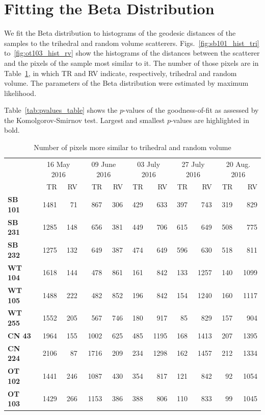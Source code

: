 \documentclass[12pt]{article}
\begin{document}
\section{Fitting the Beta Distribution}

We fit the Beta distribution to histograms of the geodesic distances of the samples to the trihedral and random volume scatterers. Figs.~\ref{fig:sb101_hist_tri} to~\ref{fig:ot103_hist_rv} show the histograms of the distances between the scatterer and the pixels of the sample most similar to it.
The number of those pixels are in Table~\ref{tab:size_sample}, in which TR and RV indicate, respectively, trihedral and random volume.
The parameters of the Beta distribution were estimated by maximum likelihood.

Table~\ref{tab:pvalues_table} shows the $p$-values of the goodness-of-fit as assessed by the Komolgorov-Smirnov test.
Largest and smallest $p$-values are highlighted in bold.

\begin{table}[hbt]
  \centering
  \caption{Number of pixels more similar to trihedral and random volume}
  \label{tab:size_sample}
  \begin{tabular}{lrrrrrrrrrr}
    \toprule
    & \multicolumn{2}{c}{16 May 2016} & \multicolumn{2}{c}{09 June 2016} & \multicolumn{2}{c}{03 July 2016} & \multicolumn{2}{c}{27 July 2016} & \multicolumn{2}{c}{20 Aug. 2016}\\
    & TR & RV & TR & RV & TR & RV & TR & RV& TR & RV\\
    \cmidrule(lr){2-11}
    \textbf{SB 101} & 1481 & 71 & 867 & 306 & 429 & 633 & 397 & 743 & 319 & 829\\
    \textbf{SB 231} & 1285 & 148 & 656 & 381 & 449 & 706 & 615 & 649 & 508 & 775\\
    \textbf{SB 232} & 1275 & 132 & 649 & 387 & 474 & 649 & 596 & 630 & 518 & 811\\
    \textbf{WT 104} & 1618 & 144 & 478 & 861 & 161 & 842 & 133 & 1257 & 140 & 1099\\
    \textbf{WT 105} & 1488 & 222 & 482 & 852 & 196 & 842 & 154 & 1240 & 160 & 1117\\
    \textbf{WT 255} & 1552 & 205 & 567 & 746 & 180 & 917 & 85 & 829 & 157 & 904\\
    \textbf{CN 43}  & 1964 & 155 & 1002 & 625 & 485 & 1195 & 168 & 1413 & 207 & 1395\\
    \textbf{CN 224} & 2106 & 87 & 1716 & 209 & 234 & 1298 & 162 & 1457 & 212 & 1334\\
    \textbf{OT 102} & 1441 & 246 & 1087 & 430 & 354 & 817 & 121 & 842 & 92 & 1054\\
    \textbf{OT 103} & 1429 & 266 & 1153 & 386 & 388 & 806 & 110 & 833 & 99 & 1045\\
    \bottomrule
  \end{tabular}
\end{table}
\end{document}
